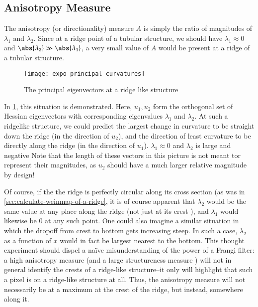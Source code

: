     \subsection{Anisotropy Measure} \label{sec:frangi.anisotropy}
    The anisotropy (or directionality) measure $A$ is simply the ratio of magnitudes of $\lambda_1$ and $\lambda_2$. Since at a ridge point of a tubular structure, we should have $\lambda_1 \approx 0$ and $\abs{\lambda_2} \gg \abs{\lambda_1}$,
    a very small value of $A$ would be present at a ridge of a tubular structure.
    
    \begin{figure} \centering
    		\texttt{[image: expo\_principal\_curvatures]}
    		\caption{The principal eigenvectors at a ridge like structure} 
    	 \label{fig:expo-principal-curvatures}
    \end{figure}
    
    In \cref{fig:expo-principal-curvatures}, this situation is demonstrated. Here, $u_1, u_2$ form the orthogonal set of Hessian eigenvectors with corresponding eigenvalues $\lambda_1$ and $\lambda_2$. At such a ridgelike structure, we could predict the largest change in curvature to be straight down the ridge (in the direction of $u_2$), and the direction of least curvature to be directly along the ridge (in the direction  of $u_1$). $\lambda_1 \approx 0$ and $\lambda_2$ is large and negative  Note that the length of these vectors in this picture is not meant tor represent their magnitudes, as $u_2$ should have a much larger relative magnitude by design!
    
    Of course, if the the ridge is perfectly circular along its cross section (as was in \cref{sec:calculate-weinmap-of-a-ridge}, it is of course apparent that $\lambda_2$ would be the same value at any place along the ridge (not just at its crest ), and $\lambda_1$ would likewise be 0 at any such point.  One could also imagine a similar situation in which the dropoff from crest to bottom gets increasing steep. In such a case, $\lambda_2$ as a function of $x$ would in fact be largest nearest to the bottom. This thought experiment should dispel a na\"{i}ve misunderstanding of the power of a Frangi filter: a high anisotropy measure (and a large structureness measure ) will not in general identify the crests of a ridge-like structure--it only will highlight that such a pixel is on a ridge-like structure at all. Thus, the anisotropy measure will not necessarily be at a maximum at the crest of the ridge, but instead, somewhere along it.
    
